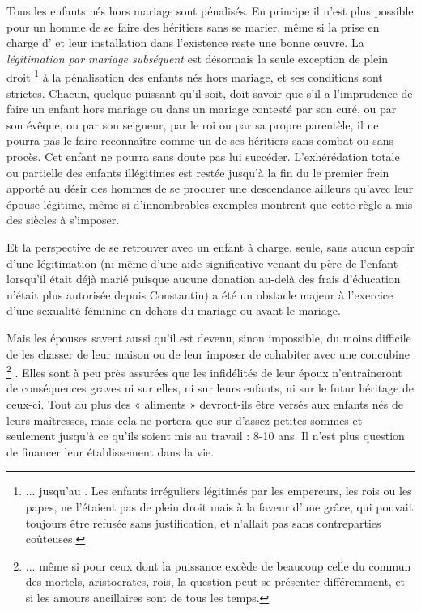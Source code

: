  Tous les enfants nés hors mariage sont pénalisés. En principe il n'est plus possible pour un homme de se faire des héritiers sans se marier, même si la prise en charge d' et leur installation dans l'existence reste une bonne œuvre. La \emph{légitimation par mariage subséquent} est désormais la seule exception de plein droit%
\footnote{... jusqu'au . Les enfants irréguliers légitimés par les empereurs, les rois ou les papes, ne l'étaient pas de plein droit mais à la faveur d'une grâce, qui pouvait toujours être refusée sans justification, et n'allait pas sans contreparties coûteuses.} 
à la pénalisation des enfants nés hors mariage, et ses conditions sont strictes. Chacun, quelque puissant qu'il soit, doit savoir que s'il a l'imprudence de faire un enfant hors mariage ou dans un mariage contesté par son curé, ou par son évêque, ou par son seigneur, par le roi ou par sa propre parentèle, il ne pourra pas le faire reconnaître comme un de ses héritiers sans combat ou sans procès. Cet enfant ne pourra sans doute pas lui succéder. L'exhérédation totale ou partielle des enfants illégitimes est restée jusqu'à la fin du  le premier frein apporté au désir des hommes de se procurer une descendance ailleurs qu'avec leur épouse légitime, même si d'innombrables exemples montrent que cette règle a mis des siècles à s'imposer.

 Et la perspective de se retrouver avec un enfant à charge, seule, sans aucun espoir d'une légitimation (ni même d'une aide significative venant du père de l'enfant lorsqu'il était déjà marié puisque aucune donation au-delà des frais d'éducation n'était plus autorisée depuis Constantin) a été un obstacle majeur à l'exercice d'une sexualité féminine en dehors du mariage ou avant le mariage. 

 Mais les épouses savent aussi qu'il est devenu, sinon impossible, du moins difficile de les chasser de leur maison ou de leur imposer de cohabiter avec une concubine%
\footnote{... même si pour ceux dont la puissance excède de beaucoup celle du commun des mortels, aristocrates, rois, la question peut se présenter différemment, et si les amours ancillaires sont de tous les temps.}%
. Elles sont à peu près assurées que les infidélités de leur époux n'entraîneront de conséquences graves ni sur elles, ni sur leurs enfants, ni sur le futur héritage de ceux-ci. Tout au plus des « aliments » devront-ils être versés aux enfants nés de leurs maîtresses, mais cela ne portera que sur d'assez petites sommes et seulement jusqu'à ce qu'ils soient mis au travail : 8-10 ans. Il n'est plus question de financer leur établissement dans la vie. 





